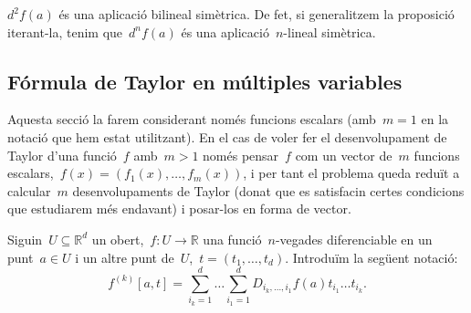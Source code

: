 \documentclass[../../Main.tex]{subfiles}
\begin{document}
	\begin{corollary}\label{obs:diferencial bilineal}
		\(d^{2}f(a)\) és una aplicació bilineal simètrica.
		De fet, si generalitzem la proposició iterant-la, tenim que~\(d^{n}f(a)\) és una aplicació~\(n\)-lineal simètrica.
	\end{corollary}
	\subsection{Fórmula de Taylor en múltiples variables}
	Aquesta secció la farem considerant només funcions escalars (amb~\(m=1\) en la notació que hem estat utilitzant).
	En el cas de voler fer el desenvolupament de Taylor d'una funció~\(f\) amb~\(m>1\) només pensar~\(f\) com un vector de~\(m\) funcions escalars,~\(f(x)=(f_{1}(x),\dots,f_{m}(x))\), i per tant el problema queda reduït a calcular~\(m\) desenvolupaments de Taylor (donat que es satisfacin certes condicions que estudiarem més endavant) i posar-los en forma de vector.
	\begin{notation}
		Siguin~\(U\subseteq\mathbb{R}^{d}\) un obert,~\(f\colon U\to\mathbb{R}\) una funció~\(n\)-vegades diferenciable en un punt~\(a\in U\) i un altre punt de~\(U\),~\(t=(t_{1},\dots,t_{d})\).
		Introduïm la següent notació:
		\[
		    f^{(k)}[a,t]=\sum_{i_{k}=1}^{d}\dots\sum_{i_{1}=1}^{d}D_{i_{k},\dots,i_{1}}f(a)t_{i_{1}}\dots t_{i_{k}}.
		\]
	\end{notation}
\end{document}
